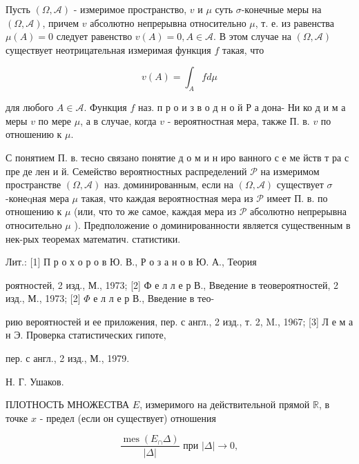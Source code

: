 \documentclass[10pt]{article}
\begin{document}
Пусть $(\Omega, \mathcal{A})$ - измеримое пространство, $v$ и $\mu$ суть $\sigma$-конечные меры на $(\Omega, \mathcal{A})$, причем $v$ абсолютно непрерывна относительно $\mu$, т. е. из равенства $\mu(A)=0$ следует равенство $v(A)=0, A \in \mathcal{A}$. В этом случае на $(\Omega, \mathcal{A})$ существует неотрицательная измеримая функция $f$ такая, что



\[

v(A)=\int_{A} f d \mu

\]



для любого $A \in \mathcal{A}$. Функция $f$ наз. п р о и з в о д н о й Р а дона- Ни ко д и м а меры $v$ по мере $\mu$, а в случае, когда $v$ - вероятностная мера, также П. в. $v$ по отношению к $\mu$.



С понятием П. в. тесно связано понятие д о м и н иро ванного с е ме йств т ра с пре де лен и й. Семейство вероятностных распределений $\mathscr{P}$ на измеримом пространстве $(\Omega, \mathcal{A})$ наз. доминированным, если на $(\Omega, \mathcal{A})$ существует $\sigma$-конеqная мера $\mu$ такая, что каждая вероятностная мера из $\mathscr{P}$ имеет П. в. по отношению к $\mu$ (или, что то же самое, каждая мера из $\mathscr{P}$ абсолютно непрерывна относительно $\mu$ ). Предположение о доминированности является существенным в нек-рых теоремах математич. статистики.



Лит.: [1] П р о х о р о в Ю. В., Р о з а н о в Ю. А., Теория

роятностей, 2 изд., М., 1973; [2] Ф е л л е р В., Введение в теовероятностей, 2 изд., М., 1973; [2] $\Phi$ е л л е р В., Введение в тео-

рию вероятностей и ее приложения, пер. с англ., 2 изд., т. 2, M., 1967; [3] Л е м а н Э. Проверка статистических гипоте,

пер. с англ., 2 изд., М., 1979.

Н. Г. Ушаков.



ПЛОТНОСТЬ МНОЖЕСТВА $E$, измеримого на действительной прямой $\mathbb{R}$, в точке $x$ - предел (если он существует) отношения



\[

\frac{\operatorname{mes}\left(E_{\cap} \Delta\right)}{|\Delta|} \text { при }|\Delta| \rightarrow 0,

\]
\end{document}
